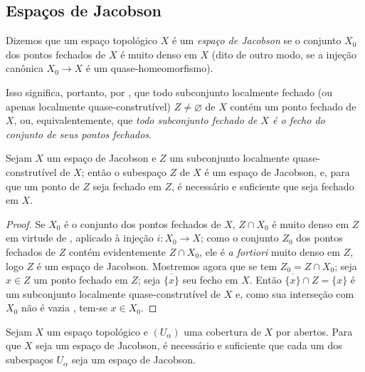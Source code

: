 \subsection{Espaços de Jacobson}
\label{subsection:IV.10.3}


\begin{definition}[10.3.1]
\label{IV.10.3.1}
Dizemos que um espaço topológico $X$ é um \emph{espaço de Jacobson} se o conjunto $X_0$ dos pontos fechados de $X$ é muito denso em $X$ (dito de outro modo, se a injeção canônica $X_0\to X$ é um quase-homeomorfismo).
\end{definition}

Isso significa, portanto, por , que todo subconjunto localmente fechado (ou apenas localmente quase-construtível) $Z\neq\varnothing$ de $X$ contém um ponto fechado de $X$, ou, equivalentemente, que \emph{todo subconjunto fechado de $X$ é o fecho do conjunto de seus pontos fechados}.

\begin{proposition}[10.3.2]
\label{IV.10.3.2}
Sejam $X$ um espaço de Jacobson e $Z$ um subconjunto localmente quase-construtível de $X$; então o subespaço $Z$ de $X$ é um espaço de Jacobson, e, para que um ponto de $Z$ seja fechado em $Z$, é necessário e suficiente que seja fechado em $X$.
\end{proposition}

\begin{proof}
Se $X_0$ é o conjunto dos pontos fechados de $X$, $Z\cap X_0$ é muito denso em $Z$ em virtude de , aplicado à injeção $i:X_0\to X$; como o conjunto $Z_0$ dos pontos fechados de $Z$ contém evidentemente $Z\cap X_0$, ele é \emph{a fortiori} muito denso em $Z$, logo $Z$ é um espaço de Jacobson.
Mostremos agora que se tem $Z_0=Z\cap X_0$; seja $x\in Z$ um ponto fechado em $Z$; seja $\overline{\{x\}}$ seu fecho em $X$.
Então $\overline{\{x\}}\cap Z=\{x\}$ é um subconjunto localmente quase-construtível de $X$ e, como sua interseção com $X_0$ não é vazia , tem-se $x\in X_0$.
\end{proof}

\begin{proposition}[10.3.3]
\label{IV.10.3.3}
Sejam $X$ um espaço topológico e $(U_\alpha)$ uma cobertura de $X$ por abertos.
Para que $X$ seja um espaço de Jacobson, é necessário e suficiente que cada um dos subespaços $U_\alpha$ seja um espaço de Jacobson.
\end{proposition}

